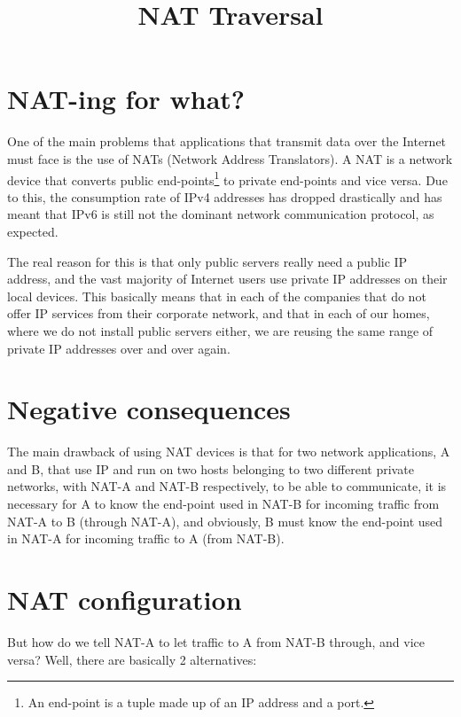 
\title{NAT Traversal}

\maketitle

\section{NAT-ing for what?}

One of the main problems that applications that transmit data over the
Internet must face is the use of NATs (Network Address Translators). A
NAT is a network device that converts public end-points\footnote{An
  end-point is a tuple made up of an IP address and a port.} to
private end-points and vice versa. Due to this, the consumption rate
of IPv4 addresses has dropped drastically and has meant that IPv6 is
still not the dominant network communication protocol, as expected.

The real reason for this is that only public servers really need a
public IP address, and the vast majority of Internet users use private
IP addresses on their local devices. This basically means that in each
of the companies that do not offer IP services from their corporate
network, and that in each of our homes, where we do not install public
servers either, we are reusing the same range of private IP addresses
over and over again.

\section{Negative consequences}

The main drawback of using NAT devices is that for two network
applications, A and B, that use IP and run on two hosts belonging to
two different private networks, with NAT-A and NAT-B respectively, to
be able to communicate, it is necessary for A to know the end-point
used in NAT-B for incoming traffic from NAT-A to B (through NAT-A),
and obviously, B must know the end-point used in NAT-A for incoming
traffic to A (from NAT-B).

\section{NAT configuration}

But how do we tell NAT-A to let traffic to A from NAT-B through, and
vice versa? Well, there are basically 2 alternatives:

